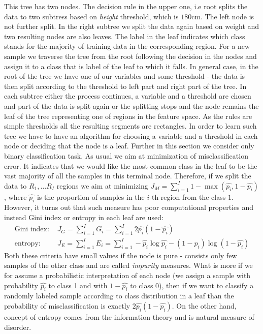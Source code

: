 \documentclass[12pt, wide]{mwart}
\begin{document}
This tree has two nodes. The decision rule in the upper one, i.e root splits the data to two subtress based on \textit{height} threshold, which is $180$cm. The left node is not further split. In the right subtree we split the data again based on weight and two resulting nodes are also leaves. The label in the leaf indicates which class stands for the majority of training data in the corresponding region. For a new sample we traverse the tree from the root following the decision in the nodes and assign it to a class that is label of the leaf to which it falls. In general case, in the root of the tree we have one of our variables and some threshold - the data is then split according to the threshold to left part and right part of the tree. In each subtree either the process continues, a variable and a threshold are chosen and part of the data is split again or the splitting stops and the node remains the leaf of the tree representing one of regions in the feature space. As the rules are simple thresholds all the resulting segments are rectangles. In order to learn such tree we have to have an algorithm for choosing a variable and a threshold in each node or deciding that the node is a leaf. Further in this section we consider only binary classification task. As usual we aim at minimization of misclassification error. It indicates that we would like the most common class in the leaf to be the vast majority of all the samples in this terminal node. Therefore, if we split the data to $R_1, \ldots R_I$ regions we aim at minimizing $J_M = \sum_{i=1}^I 1 - \max(\hat{p_i}, 1-\hat{p_i})$, where $\hat{p_i}$ is the proportion of samples in the $i$-th region from the class $1$. However, it turns out that such measure has poor computational properties and instead Gini index or entropy in each leaf are used:
\begin{align*}
        \text{Gini index:  } &J_G = \sum_{i=1}^I G_i = \sum_{i=1}^I 2\hat{p_i}(1-\hat{p_i}) \\
        \text{entropy:  } &J_E = \sum_{i=1}^I E_i= \sum_{i=1}^I -\hat{p_i}\log \hat{p_i} - (1-\hat{p_i}) \log (1-\hat{p_i})
\end{align*}
Both these criteria have small values if the node is pure - consists only few samples of the other class and are called \textit{impurity} measures. What is more if we for assume a probabilistic interpretation of each node (we assign a sample with probability $\hat{p_i}$ to class 1 and with $1-\hat{p_i}$ to class 0), then if we want to classify a randomly labeled sample according to class distribution in a leaf than the probability of misclassification is exactly $2\hat{p_i}(1-\hat{p_i})$. On the other hand, concept of entropy comes from the information theory and is natural measure of disorder.
\end{document}
